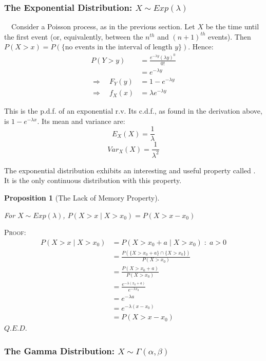\documentclass[12pt,a4paper]{article}
\newtheorem{prop}[thm]{Proposition}
\newcommand{\uline}[1]{\underline{\smash{#1}}}
\begin{document}
\subsubsection{The Exponential Distribution: $X \sim Exp(\lambda)$}

$\quad$Consider a Poisson process, as in the previous section. Let $X$ be the time until the first event (or, equivalently, between the $n^{th}$ and $(n+1)^{th}$ events). Then\\ $P(X>x) = P(\{\text{no events in the interval of length $y$}\})$. Hence:
\begin{align*}
 P(Y>y) &= \frac{e^{-\lambda y}(\lambda y)^0}{0!}\\
 &= e^{-\lambda y}\\
\Rightarrow \quad F_Y(y) &= 1 - e^{-\lambda y}\\
\Rightarrow\quad f_X(x) &= \lambda e^{-\lambda y}
\end{align*}

This is the p.d.f. of an exponential r.v. Its c.d.f., as found in the derivation above, is $1-e^{-\lambda x}$. Its mean and variance are:
$$E_{X}(X) = \frac{1}{\lambda}$$
$$Var_{X}(X) = \frac{1}{\lambda^2}$$

The exponential distribution exhibits an interesting and useful property called \uline{lack of memory}. It is the only continuous distribution with this property.

\begin{prop}[The Lack of Memory Property]$\quad$\par
\vspace{1cm}

For $X \sim Exp(\lambda)$, $P(X>x\; | \; X>x_0) = P(X>x-x_0)$
\end{prop}

\noindent\textsc{Proof:}
\begin{align*}
P(X>x\; | \; X>x_0) &= P(X > x_0 + a\; | \; X > x_0) \; : \; a>0\\
&= \frac{P(\{X > x_0 + a\}\cap \{X > x_0\})}{P(X > x_0)}\\
&= \frac{P(X > x_0 + a)}{P(X > x_0)}\\
&=\frac{e^{-\lambda (x_0 + a)}}{e^{-\lambda x_0}}\\
&= e^{-\lambda a}\\
&= e^{-\lambda (x-x_0)}\\
&= P(X>x-x_0)
\end{align*}
\hfill$Q.E.D.$

\subsubsection{The Gamma Distribution: $X \sim \Gamma(\alpha,\beta)$}
\end{document}
